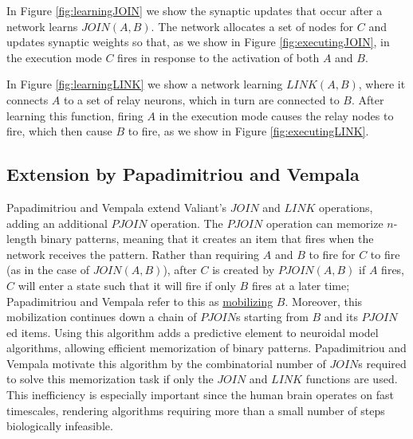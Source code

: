 \documentclass[letterpaper, 12pt]{article}
\begin{document}
In Figure \ref{fig:learningJOIN} we show the synaptic updates that occur after a network learns $JOIN(A,B)$. The network allocates a set of nodes for $C$ and updates synaptic weights so that, as we show in Figure \ref{fig:executingJOIN}, in the execution mode $C$ fires in response to the activation of both $A$ and $B$.

In Figure \ref{fig:learningLINK} we show a network learning $LINK(A,B)$, where it connects $A$ to a set of relay neurons, which in turn are connected to $B$. After learning this function, firing $A$ in the execution mode causes the relay nodes to fire, which then cause $B$ to fire, as we show in Figure \ref{fig:executingLINK}.

\subsection{Extension by Papadimitriou and Vempala}\label{sec:pjoin}
Papadimitriou and Vempala \cite{papadimitriou_cortical_2015} extend Valiant's $JOIN$ and $LINK$ operations, adding an additional $PJOIN$ operation. The $PJOIN$ operation can memorize $n$-length binary patterns, meaning that it creates an item that fires when the network receives the pattern. Rather than requiring $A$ and $B$ to fire for $C$ to fire (as in the case of $JOIN(A, B)$), after $C$ is created by $PJOIN(A,B)$ if $A$ fires, $C$ will enter a state such that it will fire if only $B$ fires at a later time; Papadimitriou and Vempala refer to this as \underline{mobilizing} $B$. Moreover, this mobilization continues down a chain of $PJOIN$s starting from $B$ and its $PJOIN$ed items. Using this algorithm adds a predictive element to neuroidal model algorithms, allowing efficient memorization of binary patterns. Papadimitriou and Vempala motivate this algorithm by the combinatorial number of $JOIN$s required to solve this memorization task if only the $JOIN$ and $LINK$ functions are used. This inefficiency is especially important since the human brain operates on fast timescales, rendering algorithms requiring more than a small number of steps biologically infeasible.
\end{document}
